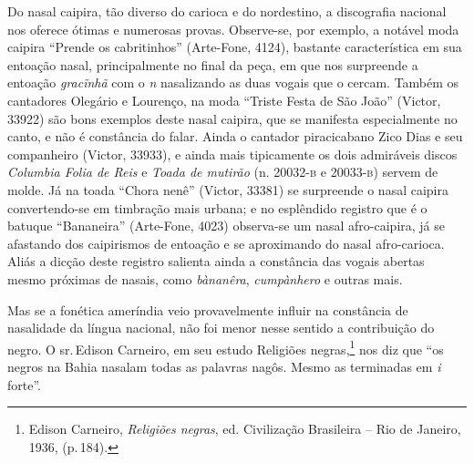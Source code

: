 Do nasal caipira, tão diverso do carioca e do nordestino, a discografia
nacional nos oferece ótimas e numerosas provas. Observe-se, por exemplo,
a notável moda caipira ``Prende os cabritinhos'' (Arte-Fone, 4124),
bastante característica em sua entoação nasal, principalmente no final
da peça, em que nos surpreende a entoação \textit{gracĩnhã} com o \textit{n}
nasalizando as duas vogais que o cercam. Também os cantadores Olegário e
Lourenço, na moda ``Triste Festa de São João'' (Victor, 33922) são bons
exemplos deste nasal caipira, que se manifesta especialmente no canto, e
não é constância do falar. Ainda o cantador piracicabano Zico Dias e seu
companheiro (Victor, 33933), e ainda mais tipicamente os dois admiráveis
discos \textit{Columbia Folia de Reis} e \textit{Toada de mutirão} (n. 20032-\textsc{b} e
20033-\textsc{b}) servem de molde. Já na toada ``Chora nenê'' (Victor, 33381) se
surpreende o nasal caipira convertendo-se em timbração mais urbana; e no
esplêndido registro que é o batuque ``Bananeira'' (Arte-Fone, 4023)
observa-se um nasal afro-caipira, já se afastando dos caipirismos de
entoação e se aproximando do nasal afro-carioca. Aliás a dicção deste
registro salienta ainda a constância das vogais abertas mesmo próximas
de nasais, como \textit{bànanêra}, \textit{cumpànhero} e outras mais.

Mas se a fonética ameríndia veio provavelmente influir na constância de
nasalidade da língua nacional, não foi menor nesse sentido a
contribuição do negro. O sr.\,Edison Carneiro, em seu estudo Religiões
negras,\footnote{Edison Carneiro, \emph{Religiões negras}, ed. Civilização Brasileira -- Rio
de Janeiro, 1936, (p.\,184).} nos diz que ``os negros na Bahia nasalam todas as palavras
nagôs. Mesmo as terminadas em \textit{i} forte''.

